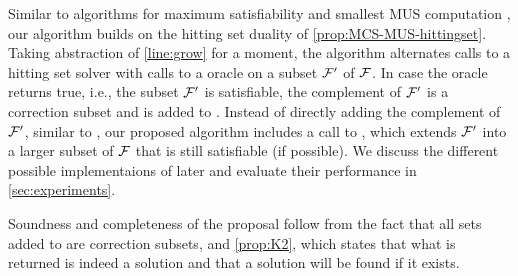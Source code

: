 %

Similar to algorithms for maximum satisfiability \cite{davies} and smallest MUS computation \cite{ignatiev2015smallest}, our algorithm builds on the hitting set duality of \cref{prop:MCS-MUS-hittingset}. 
Taking abstraction of \cref{line:grow} for a moment, 
the algorithm alternates calls to a hitting set solver with calls to a \sat oracle on a subset $\mathcal{F} '$ of $\mathcal{F} $. 
In case the \sat oracle returns true, i.e., the subset $\mathcal{F} '$ is satisfiable, the complement of $\mathcal{F} '$ is a correction subset and is added to \setstohit. 
Instead of directly adding the complement of $\mathcal{F} '$, similar to \cite{}, our proposed algorithm includes a call to \grow, which extends $\mathcal{F} '$ into a larger subset of $\mathcal{F} $ that is still satisfiable (if possible).
We discuss the different possible implementaions of \grow later and evaluate their performance in \cref{sec:experiments}. 

Soundness and completeness of the proposal follow from the fact that all sets added to \setstohit are correction subsets, and \cref{prop:K2}, which states that what is returned is indeed a solution and that a solution will be found if it exists. 
 

